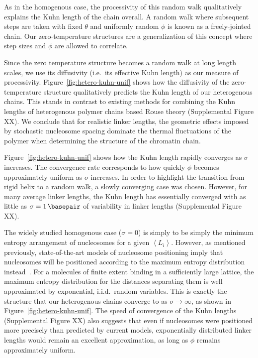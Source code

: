 \documentclass[%
 reprint,
superscriptaddress,
showpacs,preprintnumbers,
 amsmath,amssymb,
 aps,
 prl,
]{revtex4-1}
\newcommand{\meanli}{\left\langle{}L_i\right\rangle}
\begin{document}
As in the homogenous case, the processivity of this random walk qualitatively
    explains the Kuhn length of the chain overall.
A random walk where subsequent steps are taken with fixed $\theta$ and uniformly
    random $\phi$ is known as a freely-jointed chain.
Our zero-temperature structures are a generalization of this concept where step
    sizes and $\phi$ are allowed to correlate.

Since the zero temperature structure becomes a random walk at long length
    scales, we use its diffusivity (i.e.\ its effective Kuhn length) as our
    measure of processivity.
Figure~\ref{fig:hetero-kuhn-unif} shows how the diffusivity of the
    zero-temperature structure qualitatively predicts the Kuhn length of our
    heterogenous chains.
This stands in contrast to existing methods for combining the Kuhn lengths of
    heterogenous polymer chains based Rouse theory (Supplemental Figure XX).
We conclude that for realistic linker lengths, the geometric effects imposed by
    stochastic nucleosome spacing dominate the thermal fluctuations of the
    polymer when determining the structure of the chromatin chain.

Figure~\ref{fig:hetero-kuhn-unif} shows how the Kuhn length rapidly converges as
    $\sigma$ increases.
The convergence rate corresponds to how quickly $\phi$ becomes approximately
    uniform as $\sigma$ increases.
In order to highlight the transition from rigid helix to a random walk, a slowly
    converging case was chosen.
However, for many average linker lengths, the Kuhn length has essentially
    converged with as little as $\sigma = \SI{1}{\basepair}$ of variability in
    linker lengths (Supplemental Figure XX).

The widely studied homogenous case ($\sigma=0$) is simply to be simply the
    minimum entropy arrangement of nucleosomes for a given $\meanli$.
However, as mentioned previously, state-of-the-art models of nucleosome
    positioning imply that nucleosomes will be positioned according to the
    maximum entropy distribution instead~\cite{beshnova2014}.
For a molecules of finite extent binding in a sufficiently large lattice, the
    maximum entropy distribution for the distances separating them is well
    approximated by exponential, i.i.d.\ random variables.
This is exactly the structure that our heterogenous chains converge to as
    $\sigma\to\infty$, as shown in Figure~\ref{fig:hetero-kuhn-unif}.
The speed of convergence of the Kuhn lengths (Supplemental Figure XX) also
    suggests that even if nucleosomes were positioned more precisely than
    predicted by current models, exponentially distributed linker lengths would
    remain an excellent approximation, as long as $\phi$ remains approximately
    uniform.
\end{document}
